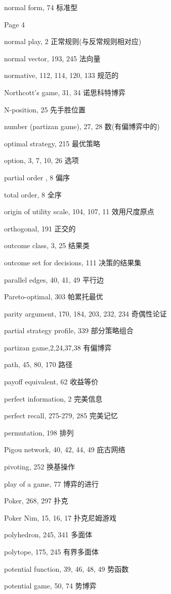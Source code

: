 normal form, 74 标准型 


Page 4  %

normal play, 2 正常规则(与反常规则相对应)


normal vector, 193, 245 法向量


normative, 112, 114, 120, 133 规范的


Northcott's game, 31, 34 诺思科特博弈


N-position, 25 先手胜位置


number (partizan game), 27, 28 数(有偏博弈中的)


optimal strategy, 215 最优策略


option, 3, 7, 10, 26 选项

partial order , 8 偏序

total order, 8 全序

origin of utility scale, 104, 107, 11 效用尺度原点


orthogonal, 191 正交的


outcome class, 3, 25 结果类


outcome set for decisions, 111 决策的结果集


parallel edges, 40, 41, 49 平行边


Pareto-optimal, 303 帕累托最优


parity argument, 170, 184, 203, 232, 234 奇偶性论证



partial strategy profile, 339 部分策略组合


partizan game,2,24,37,38 有偏博弈


path, 45, 80, 170 路径


payoff equivalent, 62 收益等价


perfect information, 2 完美信息


perfect recall, 275-279, 285 完美记忆


permutation, 198 排列

Pigou network, 40, 42, 44, 49 庇古网络


pivoting, 252 换基操作


play of a game, 77 博弈的进行


Poker, 268, 297 扑克


Poker Nim, 15, 16, 17 扑克尼姆游戏


polyhedron, 245, 341 多面体


polytope, 175, 245 有界多面体


potential function, 39, 46, 48, 49 势函数


potential game, 50, 74 势博弈


